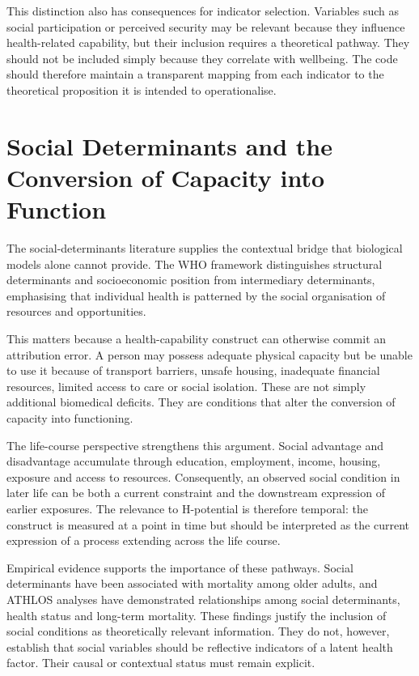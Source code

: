 This distinction also has consequences for indicator selection. Variables such as social participation or perceived security may be relevant because they influence health-related capability, but their inclusion requires a theoretical pathway. They should not be included simply because they correlate with wellbeing. The code should therefore maintain a transparent mapping from each indicator to the theoretical proposition it is intended to operationalise.

\section{Social Determinants and the Conversion of Capacity into Function}

The social-determinants literature supplies the contextual bridge that biological models alone cannot provide. The WHO framework distinguishes structural determinants and socioeconomic position from intermediary determinants, emphasising that individual health is patterned by the social organisation of resources and opportunities. \cite{solar_irwin_2010}

This matters because a health-capability construct can otherwise commit an attribution error. A person may possess adequate physical capacity but be unable to use it because of transport barriers, unsafe housing, inadequate financial resources, limited access to care or social isolation. These are not simply additional biomedical deficits. They are conditions that alter the conversion of capacity into functioning.

The life-course perspective strengthens this argument. Social advantage and disadvantage accumulate through education, employment, income, housing, exposure and access to resources. Consequently, an observed social condition in later life can be both a current constraint and the downstream expression of earlier exposures. The relevance to H-potential is therefore temporal: the construct is measured at a point in time but should be interpreted as the current expression of a process extending across the life course.

Empirical evidence supports the importance of these pathways. Social determinants have been associated with mortality among older adults, and ATHLOS analyses have demonstrated relationships among social determinants, health status and long-term mortality. \cite{social_determinants_mortality_2014,athlos_social_determinants_2018} These findings justify the inclusion of social conditions as theoretically relevant information. They do not, however, establish that social variables should be reflective indicators of a latent health factor. Their causal or contextual status must remain explicit.

